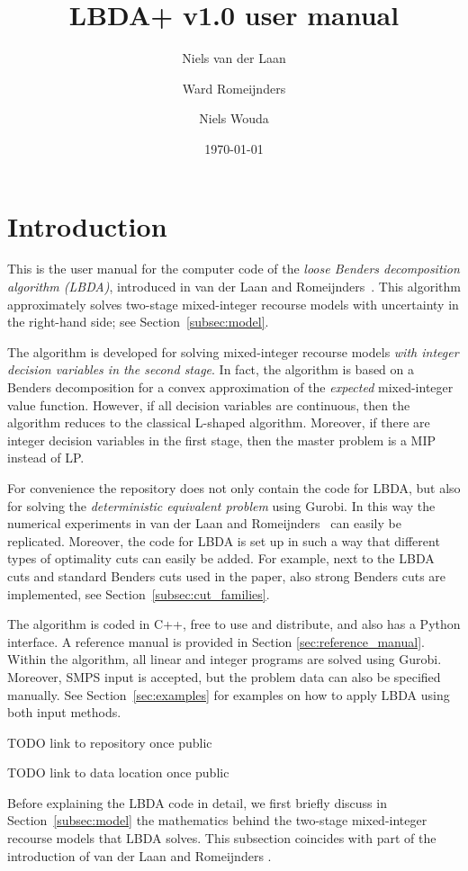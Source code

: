 \documentclass[12pt, english]{article}
\title{LBDA+ v1.0 user manual}
\author{
	Niels van der Laan
	\and
	Ward Romeijnders
	\and
	Niels Wouda
}
\date{\today}
\begin{document}
	
\maketitle
\tableofcontents

\clearpage

\section{Introduction}
\label{sec:introduction}
This is the user manual for the computer code of the \emph{loose Benders decomposition algorithm (LBDA)}, introduced in van der Laan and Romeijnders~\cite{vanderLaan2020}. This algorithm approximately solves two-stage mixed-integer recourse models with uncertainty in the right-hand side; see Section~\ref{subsec:model}. 

The algorithm is developed for solving mixed-integer recourse models \emph{with integer decision variables in the second stage}. In fact, the algorithm is based on a Benders decomposition for a convex approximation of the \emph{expected} mixed-integer value function. However, if all decision variables are continuous, then the algorithm reduces to the classical L-shaped algorithm. Moreover, if there are integer decision variables in the first stage, then the master problem is a MIP instead of LP.

For convenience the repository does not only contain the code for LBDA, but also for solving the \emph{deterministic equivalent problem} using Gurobi. In this way the numerical experiments in van der Laan and Romeijnders~\cite{vanderLaan2020} can easily be replicated. Moreover, the code for LBDA is set up in such a way that different types of optimality cuts can easily be added. For example, next to the LBDA cuts and standard Benders cuts used in the paper, also strong Benders cuts are implemented, see Section~\ref{subsec:cut_families}.

The algorithm is coded in C++, free to use and distribute, and also has a Python interface. A reference manual is provided in Section \ref{sec:reference_manual}. Within the algorithm, all linear and integer programs are solved using Gurobi. Moreover, SMPS input is accepted, but the problem data can also be specified manually. See Section~\ref{sec:examples} for examples on how to apply LBDA using both input methods. 

TODO link to repository once public

TODO link to data location once public

Before explaining the LBDA code in detail, we first briefly discuss in Section~\ref{subsec:model} the mathematics behind the two-stage mixed-integer recourse models that LBDA solves. This subsection coincides with part of the introduction of van der Laan and Romeijnders \cite{vanderLaan2020}.
\end{document}
